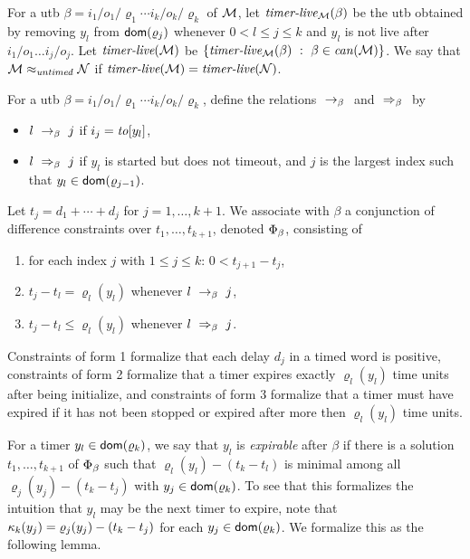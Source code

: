 For a utb $\beta  =  {i_1/o_1/\varrho_1}  \cdots {i_k/o_k/\varrho_k}$ of ${\mathcal M}$,
let $\mbox{\it timer-live}_{{\mathcal M}}({\beta})$ be the utb obtained by removing 
$y_l$ from ${\textsf{dom}}(\varrho_j)$ whenever $0 < l \leq j \leq k$ and
$y_l$ is not live after $i_1/o_1 \ldots i_j/o_j$.
Let
$\mbox{\it timer-live}({{\mathcal M}})$ be $\lbrace \mbox{\it timer-live}_{{\mathcal M}}({\beta}) ~:~ \beta \in \mathit{can}({{\mathcal M}})\rbrace$.
We say that ${\mathcal M} \approx_{\mathit{untimed}} {\mathcal N}$ if
$\mbox{\it timer-live}({{\mathcal M}}) = \mbox{\it timer-live}({{\mathcal N}})$.

For a utb $\beta  =  {i_1/o_1/\varrho_1}  \cdots {i_k/o_k/\varrho_k}$,
define the relations $\ \rightarrow_{\beta} \ $ and $\ \Rightarrow_{\beta}\ $ by
\begin{itemize}
\item
  $l \ \rightarrow_{\beta} \  j$ if $i_j = \mathit{to}[y_l]$,
  \item
    $l \ \Rightarrow_{\beta}\  j$ if $y_l$ is started but does not timeout, and
$j$ is the largest index such that $y_l \in {\textsf{dom}}(\varrho_{j-1})$.
\end{itemize}
Let $t_j = d_1 + \cdots + d_j$ for $j = 1 , \ldots, k+1$.
We associate with $\beta$ a conjunction of difference constraints over
$t_1, \ldots, t_{k+1}$, denoted $\Phi_{\beta}$, consisting of
\begin{enumerate}
\item
for each index $j$ with $1 \leq j \leq k$:  $0 <  t_{j+1} - t_j$,
\item
$t_j - t_l = \varrho_l(y_l)$ whenever $l \ \rightarrow_{\beta} \  j$,
\item
$t_j -t_l \leq \varrho_l(y_l)$ whenever $l \ \Rightarrow_{\beta}\  j$.
\end{enumerate}
Constraints of form 1 formalize that each delay $d_j$ in a timed word is
positive,
constraints of form 2 formalize that a timer expires exactly $\varrho_l(y_l)$
time units after being initialize, and
constraints of form 3 formalize that a timer must have expired if it has
not been stopped or expired after  more then $\varrho_l(y_l)$ time units.

For a timer $y_l \in {\textsf{dom}}(\varrho_k)$,
we say that $y_l$ is \emph{expirable} after $\beta$ if there is a
solution $t_1, \ldots , t_{k+1}$ of  $\Phi_{\beta}$ such that
$\varrho_l(y_l) - (t_k - t_l)$ is minimal among all
$\varrho_j(y_j) - (t_k - t_j)$ with $y_j \in {\textsf{dom}}(\varrho_k)$.
To see that this formalizes the intuition that $y_l$ may be the next
timer to expire, note that
$\kappa_k(y_j) = \varrho_j(y_j) - (t_k - t_j)$ for each $y_j \in {\textsf{dom}}(\varrho_k)$.
We formalize this as the following lemma.

